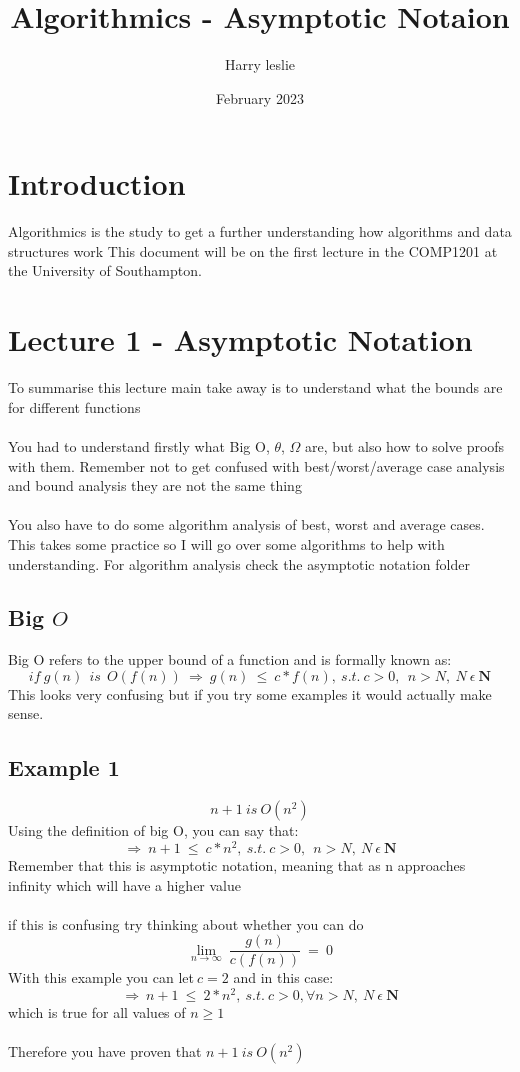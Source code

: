 \documentclass{article}
\title{Algorithmics - Asymptotic Notaion}
\author{Harry leslie}
\date{February 2023}
\begin{document}
\maketitle

\section{Introduction}
Algorithmics is the study to get a further understanding how algorithms and data structures work This document will be on the first lecture in the COMP1201 at the University of Southampton.

\section{Lecture 1 - Asymptotic Notation}
To summarise this lecture main take away is to understand what the bounds are for different functions \\ \\ You had to understand firstly what Big O, $\theta$, $\Omega$ are, but also how to solve proofs with them. Remember not to get confused with best/worst/average case analysis and bound analysis they are not the same thing \\ \\ You also have to do some algorithm analysis of best, worst and average cases. This takes some practice so I will go over some algorithms to help with understanding. For algorithm analysis check the asymptotic notation folder
\subsection{Big $O$}
Big O refers to the upper bound of a function and is formally known as:
$$ if \ g(n)\ \ is\ \ O(f(n))\ \Rightarrow \ g(n)\ \leq \ c*f(n), \ s.t.\ c > 0, \ \ n > N, \ N \ \epsilon \ \mathbf{N} $$
This looks very confusing but if you try some examples it would actually make sense. 

\subsection{Example 1}
$$ n + 1\ is \ O(n^2) $$ 
Using the definition of big O, you can say that:
$$ \Rightarrow \ n + 1 \ \leq \ c*n^2, \ s.t.\ c > 0, \ \ n > N, \ N \ \epsilon \ \mathbf{N}$$
Remember that this is asymptotic notation, meaning that as n approaches infinity which will have a higher value \\ \\ if this is confusing try thinking about whether you can do $$\lim_{n \to \infty} \ \frac{g(n)}{c(f(n))} \ = \ 0 $$
With this example you can let$\ c= 2$ and in this case:
$$ \Rightarrow \ n + 1 \ \leq \ 2*n^2, \ s.t.\ c > 0, \forall n > N,  \ N \ \epsilon \ \mathbf{N}$$
which is true for all values of $ n \ge 1 $ \\ \\
Therefore you have proven that $ n + 1\ is \ O(n^2) $
\end{document}
